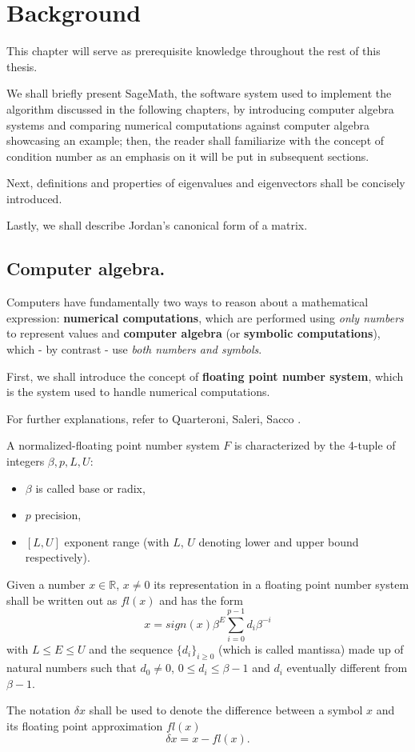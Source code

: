 \section{Background}
This chapter will serve as prerequisite knowledge throughout the rest of this thesis.

We shall briefly present SageMath, the software system used to implement the algorithm discussed in the following chapters,
by introducing computer algebra systems and comparing numerical computations against computer algebra showcasing an
example; then, the reader shall familiarize with the concept of condition number as an emphasis on it will be put in
subsequent sections.

Next, definitions and properties of eigenvalues and eigenvectors shall be concisely introduced.

Lastly, we shall describe Jordan's canonical form of a matrix.

\subsection*{Computer algebra.}
Computers have fundamentally two ways to reason about a mathematical expression: \textbf{numerical computations}, which are
performed using \textit{only numbers} to represent values and \textbf{computer algebra} (or \textbf{symbolic computations}),
which - by contrast - use \textit{both numbers and symbols}.

First, we shall introduce the concept of \textbf{floating point number system}, which is the system used to handle numerical
computations.

For further explanations, refer to Quarteroni, Saleri, Sacco \cite{numerical-mathematics}.
\begin{definition} \cite[2.5.2]{numerical-mathematics}
    A normalized-floating point number system \(F\) is characterized by the 4-tuple of integers \(\beta, p, L, U\):
    \begin{itemize}[topsep=0pt, itemsep=0pt, parsep=0pt]
        \item \(\beta\) is called base or radix,
        \item \(p\) precision,
        \item \([L, U]\) exponent range (with \(L\), \(U\) denoting lower and upper bound respectively).
    \end{itemize}
    Given a number \(x \in \mathbb{R}\), \(x \neq 0\) its representation in a floating point number system shall be written
    out as \(fl(x)\) and has the form
    \[x = sign(x) \beta^E \sum_{i=0}^{p-1}d_{i}\beta^{-i}\]
    with \(L \leq E \leq U\) and the sequence \(\{d_{i}\}_{i \geq 0}\) (which is called mantissa) made up of
    natural numbers such that \(d_{0} \neq 0\), \(0 \leq d_{i} \leq \beta - 1\) and \(d_{i}\)
    eventually different from \(\beta - 1\).

    The notation \(\delta x\) shall be used to denote the difference between a symbol \(x\) and its floating point
    approximation \(fl(x)\)
    \[
        \delta x = x - fl(x).
    \]
\end{definition}

